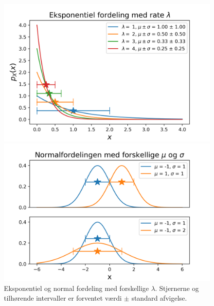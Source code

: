 \begin{figure}
\centering
\begin{minipage}[b][][b]{.45\textwidth}
\centering
\includegraphics[width = \textwidth]{exp_dist.png}
\end{minipage}
\begin{minipage}[b][][b]{.45\textwidth}
\centering
\includegraphics[width = \textwidth]{normal.png}
\end{minipage}
\caption{Eksponentiel og normal fordeling med forskellige $\lambda$. Stjernerne og tilhørende intervaller er forventet værdi $\pm$ standard afvigelse.} \label{fig:expnorm}
\end{figure}

